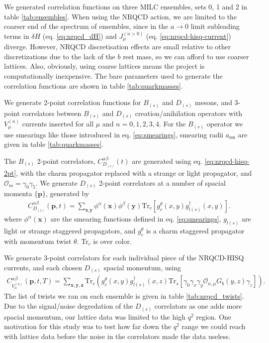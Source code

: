 We generated correlation functions on three MILC ensembles, sets 0, 1 and 2 in table \ref{tab:ensembles}. When using the NRQCD action, we are limited to the coarser end of the spectrum of ensembles, since in the $a\to 0$ limit subleading terms in $\delta H$ (eq. \eqref{eq:nrqcd_dH}) and $J^{(n>0)}_{\mu}$ (eq. \eqref{eq:nrqcd-hisq-current}) diverge. However, NRQCD discretisation effects are small relative to other discretizations due to the lack of the $b$ rest mass, so we can afford to use coarser lattices. Also, obviously, using coarse lattices means the project is computationally inexpensive. The bare parameters used to generate the correlation functions are shown in table \ref{tab:quarkmasses}.

We generate 2-point correlation functions for $B_{(s)}$ and $D_{(s)}$ mesons, and 3-point correlators between $B_{(s)}$ and $D_{(s)}$ creation/anihilation operators with $V^{(n)}_{\mu}$ currents inserted for all $\mu$ and $n=0,1,2,3,4$. For the $B_{(s)}$ operator we use smearings like those introduced in eq. \eqref{eq:smearings}, smearing radii $a_{\text{sm}}$ are given in table \ref{tab:quarkmasses}.

The $B_{(s)}$ 2-point correlators, $C_{D_{(s)}}^{\alpha\beta}(t)$ are generated using eq. \eqref{eq:nrqcd-hisq-2pt}, with the charm propagator replaced with a strange or light propagator, and $\mathcal{O}_{m} = \gamma_0\gamma_5$. We generate $D_{(s)}$ 2-point correlators at a number of spacial momenta $\{{\textbf{p}}\}$, generated by
\begin{align}
  C_{D_{(s)}}^{\alpha\beta}({\textbf{p}},t) = \sum_{\textbf{x},\textbf{y}} \phi^{\alpha}({\textbf{x}})\phi^{\beta}({\textbf{y}}) \text{Tr}_c[g_c^{\theta}(x,y) g^{\dagger}_{l(s)}(x,y) ].
\end{align}
where $\phi^{\alpha}({\textbf{x}})$ are the smearing functions defined in eq. \eqref{eq:smearings}, $g_{l(s)}$ are light or strange staggered propagators, and $g_c^{\theta}$ is a charm staggered propagator with momentum twist $\theta$. Tr$_c$ is over color.

We generate 3-point correlators for each individual piece of the NRQCD-HISQ currents, and each chosen $D_{(s)}$ spacial momentum, using
\begin{align}
  C_{V_{\mu}^{(n)}}^{\alpha\beta} ({\textbf{p}},t,T) = \sum_{\textbf{x},\textbf{y},\textbf{z}} \text{Tr}_c\left( g_c^{\theta}(x,y) g_{l(s)}^{\dagger}(x,z) \text{Tr}_s\left[ \gamma_0 \gamma_x\gamma_y \mathcal{O}_{n,\mu}G_b(y,z) \gamma_z \right] \right).
\end{align}
The list of twists we ran on each ensemble is given in table \ref{tab:nrqcd_twists}. Due to the signal/noise degredation of the $D_{(s)}$ correlators as one adds more spacial momentum, our lattice data was limited to the high $q^2$ region. One motivation for this study was to test how far down the $q^2$ range we could reach with lattice data before the noise in the correlators made the data useless.

